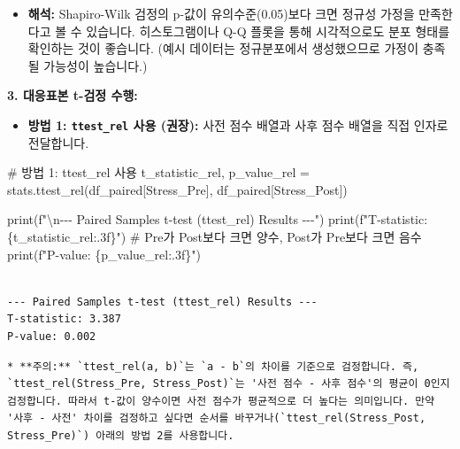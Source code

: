 \documentclass[
  letterpaper,
]{book}
\newenvironment{Shaded}{\begin{snugshade}}{\end{snugshade}}
\newcommand{\BuiltInTok}[1]{\textcolor[rgb]{0.00,0.23,0.31}{#1}}
\newcommand{\CharTok}[1]{\textcolor[rgb]{0.13,0.47,0.30}{#1}}
\newcommand{\CommentTok}[1]{\textcolor[rgb]{0.37,0.37,0.37}{#1}}
\newcommand{\NormalTok}[1]{\textcolor[rgb]{0.00,0.23,0.31}{#1}}
\newcommand{\OperatorTok}[1]{\textcolor[rgb]{0.37,0.37,0.37}{#1}}
\newcommand{\SpecialCharTok}[1]{\textcolor[rgb]{0.37,0.37,0.37}{#1}}
\newcommand{\SpecialStringTok}[1]{\textcolor[rgb]{0.13,0.47,0.30}{#1}}
\newcommand{\StringTok}[1]{\textcolor[rgb]{0.13,0.47,0.30}{#1}}
\providecommand{\tightlist}{%
  \setlength{\itemsep}{0pt}\setlength{\parskip}{0pt}}
\begin{document}
\begin{itemize}
\tightlist
\item
  \textbf{해석:} Shapiro-Wilk 검정의 p-값이 유의수준(0.05)보다 크면
  정규성 가정을 만족한다고 볼 수 있습니다. 히스토그램이나 Q-Q 플롯을
  통해 시각적으로도 분포 형태를 확인하는 것이 좋습니다. (예시 데이터는
  정규분포에서 생성했으므로 가정이 충족될 가능성이 높습니다.)
\end{itemize}

\textbf{3. 대응표본 t-검정 수행:}

\begin{itemize}
\tightlist
\item
  \textbf{방법 1: \texttt{ttest\_rel} 사용 (권장):} 사전 점수 배열과
  사후 점수 배열을 직접 인자로 전달합니다.
\end{itemize}

\begin{Shaded}
\begin{Highlighting}[]
    \CommentTok{\# 방법 1: ttest\_rel 사용}
\NormalTok{    t\_statistic\_rel, p\_value\_rel }\OperatorTok{=}\NormalTok{ stats.ttest\_rel(df\_paired[}\StringTok{\textquotesingle{}Stress\_Pre\textquotesingle{}}\NormalTok{], df\_paired[}\StringTok{\textquotesingle{}Stress\_Post\textquotesingle{}}\NormalTok{])}

    \BuiltInTok{print}\NormalTok{(}\SpecialStringTok{f"}\CharTok{\textbackslash{}n}\SpecialStringTok{{-}{-}{-} Paired Samples t{-}test (ttest\_rel) Results {-}{-}{-}"}\NormalTok{)}
    \BuiltInTok{print}\NormalTok{(}\SpecialStringTok{f"T{-}statistic: }\SpecialCharTok{\{}\NormalTok{t\_statistic\_rel}\SpecialCharTok{:.3f\}}\SpecialStringTok{"}\NormalTok{) }\CommentTok{\# Pre가 Post보다 크면 양수, Post가 Pre보다 크면 음수}
    \BuiltInTok{print}\NormalTok{(}\SpecialStringTok{f"P{-}value: }\SpecialCharTok{\{}\NormalTok{p\_value\_rel}\SpecialCharTok{:.3f\}}\SpecialStringTok{"}\NormalTok{)}
\end{Highlighting}
\end{Shaded}

\begin{verbatim}

--- Paired Samples t-test (ttest_rel) Results ---
T-statistic: 3.387
P-value: 0.002
\end{verbatim}

\begin{verbatim}
* **주의:** `ttest_rel(a, b)`는 `a - b`의 차이를 기준으로 검정합니다. 즉, `ttest_rel(Stress_Pre, Stress_Post)`는 '사전 점수 - 사후 점수'의 평균이 0인지 검정합니다. 따라서 t-값이 양수이면 사전 점수가 평균적으로 더 높다는 의미입니다. 만약 '사후 - 사전' 차이를 검정하고 싶다면 순서를 바꾸거나(`ttest_rel(Stress_Post, Stress_Pre)`) 아래의 방법 2를 사용합니다.
\end{verbatim}
\end{document}
